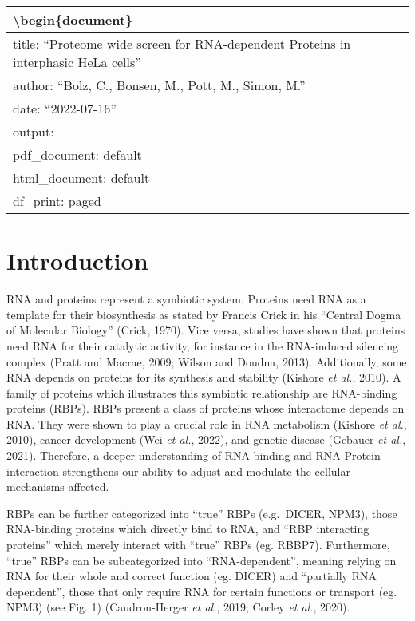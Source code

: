 \documentclass[
]{article}
\author{}
\date{\vspace{-2.5em}}
\begin{document}
\begin{longtable}[]{@{}l@{}}
\toprule()
\textbackslash begin\{document\} \\
\midrule()
\endhead
title: ``Proteome wide screen for RNA-dependent Proteins in interphasic
HeLa cells'' \\
author: ``Bolz, C., Bonsen, M., Pott, M., Simon, M.'' \\
date: ``2022-07-16'' \\
output: \\
pdf\_document: default \\
html\_document: default \\
df\_print: paged \\
\bottomrule()
\end{longtable}

\hypertarget{introduction}{%
\section{Introduction}\label{introduction}}

RNA and proteins represent a symbiotic system. Proteins need RNA as a
template for their biosynthesis as stated by Francis Crick in his
``Central Dogma of Molecular Biology'' (Crick, 1970). Vice versa,
studies have shown that proteins need RNA for their catalytic activity,
for instance in the RNA-induced silencing complex (Pratt and Macrae,
2009; Wilson and Doudna, 2013). Additionally, some RNA depends on
proteins for its synthesis and stability (Kishore \emph{et al.}, 2010).
A family of proteins which illustrates this symbiotic relationship are
RNA-binding proteins (RBPs). RBPs present a class of proteins whose
interactome depends on RNA. They were shown to play a crucial role in
RNA metabolism (Kishore \emph{et al.}, 2010), cancer development (Wei
\emph{et al.}, 2022), and genetic disease (Gebauer \emph{et al.}, 2021).
Therefore, a deeper understanding of RNA binding and RNA-Protein
interaction strengthens our ability to adjust and modulate the cellular
mechanisms affected.

RBPs can be further categorized into ``true'' RBPs (e.g.~DICER, NPM3),
those RNA-binding proteins which directly bind to RNA, and ``RBP
interacting proteins'' which merely interact with ``true'' RBPs (eg.
RBBP7). Furthermore, ``true'' RBPs can be subcategorized into
``RNA-dependent'', meaning relying on RNA for their whole and correct
function (eg. DICER) and ``partially RNA dependent'', those that only
require RNA for certain functions or transport (eg. NPM3) (see Fig. 1)
(Caudron-Herger \emph{et al.}, 2019; Corley \emph{et al.}, 2020).
\end{document}
